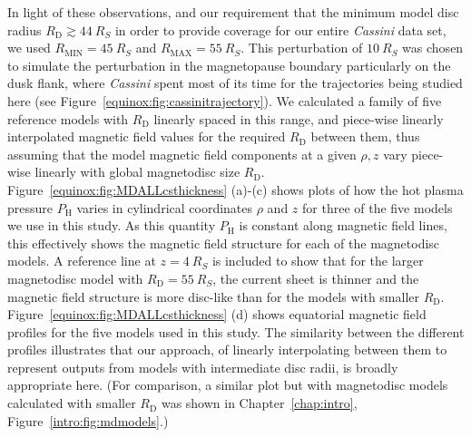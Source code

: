 In light of these observations, and our requirement that the minimum model disc radius $R_\mathrm{D} \gtrsim \SI{44}{R_S}$ in order to provide coverage for our entire \textit{Cassini} data set, we used $R_\mathrm{MIN} = \SI{45}{R_S}$ and $R_\mathrm{MAX}=\SI{55}{R_S}$. This perturbation of $\SI{10}{R_S}$ was chosen to simulate the perturbation in the magnetopause boundary particularly on the dusk flank, where \textit{Cassini} spent most of its time for the trajectories being studied here (see Figure~\ref{equinox:fig:cassinitrajectory}). We calculated a family of five reference models with $R_\mathrm{D}$ linearly spaced in this range, and piece-wise linearly interpolated magnetic field values for the required $R_\mathrm{D}$ between them, thus assuming that the model magnetic field components at a given $\rho,z$ vary piece-wise linearly with global magnetodisc size $R_\mathrm{D}$. Figure~\ref{equinox:fig:MDALLcsthickness} (a)-(c) shows plots of how the hot plasma pressure $P_\mathrm{H}$ varies in cylindrical coordinates $\rho$ and $z$ for three of the five models we use in this study. As this quantity $P_\mathrm{H}$ is constant along magnetic field lines, this effectively shows the magnetic field structure for each of the magnetodisc models. A reference line at $z=\SI{4}{R_S}$ is included to show that for the larger magnetodisc model with $R_\mathrm{D}=\SI{55}{R_S}$, the current sheet is thinner and the magnetic field structure is more disc-like than for the models with smaller $R_\mathrm{D}$. Figure~\ref{equinox:fig:MDALLcsthickness} (d) shows equatorial magnetic field profiles for the five models used in this study. The similarity between the different profiles illustrates that our approach, of linearly interpolating between them to represent outputs from models with intermediate disc radii, is broadly appropriate here. (For comparison, a similar plot but with magnetodisc models calculated with smaller $R_\mathrm{D}$ was shown in Chapter~\ref{chap:intro}, Figure~\ref{intro:fig:mdmodels}.)

